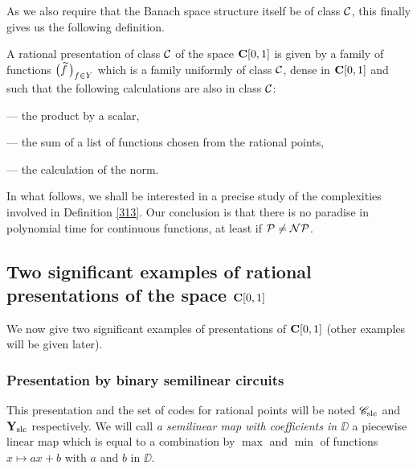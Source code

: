 As we also require that the Banach space structure itself be of class ${{\cal C}}$, this finally gives us the following definition.

\begin{definition}\label{313}
A rational presentation of class ${{\cal C}}$ of the space ${{\bf C}[0,1]}$ is given by a family of functions $\big(\widetilde{f}\,\big)_{f \in Y}$ which is a family uniformly of class ${{\cal C}}$, dense in ${{\bf C}[0,1]}$ and such that the following calculations are also in class ${{\cal C}}$:


\noindent 
--- the product by a scalar,

\noindent 
--- the sum of a list of functions chosen from the rational points,

\noindent 
--- the calculation of the norm.
\end{definition}

In what follows, we shall be interested in a precise study of the complexities involved in Definition \ref{313}. Our conclusion is that there is no paradise in polynomial time for continuous functions, at least if ${\cal P} \not= {\cal NP}$. 

\subsection{Two significant examples of rational presentations of the space \texorpdfstring{${{\bf C}[0,1]}$}{C[0,1]}}\label{subsec32}

We now give two significant examples of presentations of ${{\bf C}[0,1]}$ (other examples will be given later).

\subsubsection{Presentation by binary semilinear circuits} 
\label{subsubsec321} 

This presentation and the set of codes for rational points will be noted ${{{\mathscr C}}_{\rm slc}}$ and ${{\bf Y}_{\rm slc}}$ respectively. We will call {\em a semilinear map with coefficients in $\DD$} a piecewise linear map which is equal to a combination by $\max$ and $\min$ of functions $x \mapsto ax+b$ with $a$ and $b$ in $\DD$.


